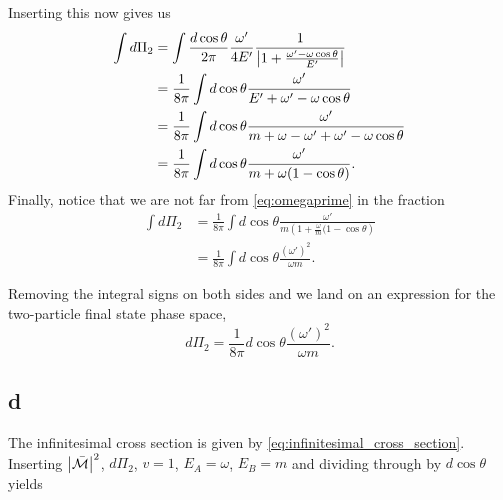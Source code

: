 \documentclass[11pt, a4paper]{amsart}
\begin{document}
Inserting this now gives us
\begin{align}
\int d\Pi_2 &= \int \frac{d\cos\theta}{2\pi} \frac{\omega'}{4E'} \frac{1}{\abs{1 + \frac{\omega' - \omega\cos\theta}{E'}}} \\
			&= \frac{1}{8\pi} \int d\cos \theta \frac{\omega'}{E' + \omega' - \omega\cos\theta} \\
			&= \frac{1}{8\pi} \int d\cos \theta \frac{\omega'}{m + \omega - \omega' + \omega' - \omega\cos\theta} \\
			&= \frac{1}{8\pi} \int d\cos \theta \frac{\omega'}{m + \omega(1 - \cos\theta)}.
\end{align}
Finally, notice that we are not far from \autoref{eq:omegaprime} in the fraction
\begin{align}
\int d\Pi_2 &= \frac{1}{8\pi} \int d\cos \theta \frac{\omega'}{m\left(1 + \frac{\omega}{m}(1 - \cos\theta\right)} \\
 			&= \frac{1}{8\pi} \int d\cos \theta \frac{(\omega')^2}{\omega m}.
\end{align}

Removing the integral signs on both sides and we land on an expression for the two-particle final state phase space,
\begin{equation}
d\Pi_2 = \frac{1}{8\pi} d\cos \theta \frac{(\omega')^2}{\omega m}.
\end{equation}

\subsection{d}
The infinitesimal cross section is given by \autoref{eq:infinitesimal_cross_section}. Inserting $\abs{\bar{\mathcal{M}}}^2$, $d\Pi_2$, $v= 1$, $E_A = \omega$, $E_B = m$ and dividing through by $d\cos\theta$ yields
\end{document}
